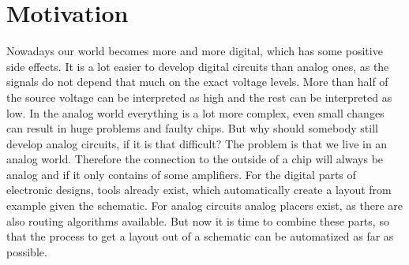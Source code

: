 \chapter{Motivation}

Nowadays our world becomes more and more digital, which has some positive side effects. It is a lot easier to develop digital circuits than analog ones, as the signals do not depend that much on the exact voltage levels. More than half of the source voltage can be interpreted as high and the rest can be interpreted as low. In the analog world everything is a lot more complex, even small changes can result in huge problems and faulty chips. But why should somebody still develop analog circuits, if it is that difficult? The problem is that we live in an analog world. Therefore the connection to the outside of a chip will always be analog and if it only contains of some amplifiers. For the digital parts of electronic designs, tools already exist, which automatically create a layout from example given the schematic. For analog circuits analog placers exist, as there are also routing algorithms available. But now it is time to combine these parts, so that the process to get a layout out of a schematic can be automatized as far as possible.
